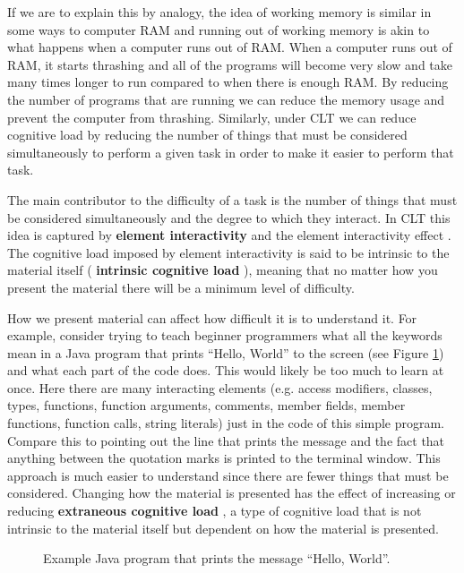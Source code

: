 \documentclass[12pt]{article}
\theoremstyle{grammarstyle}
\newcommand{\keyword}[1]{%
    \textbf{#1}%
}
\begin{document}
If we are to explain this by analogy, the idea of working memory is similar in some ways to computer RAM and running out of working memory is akin to what happens when a computer runs out of RAM. When a computer runs out of RAM, it starts thrashing and all of the programs will become very slow and take many times longer to run compared to when there is enough RAM. By reducing the number of programs that are running we can reduce the memory usage and prevent the computer from thrashing. Similarly, under CLT we can reduce cognitive load by reducing the number of things that must be considered simultaneously to perform a given task in order to make it easier to perform that task.

The main contributor to the difficulty of a task is the number of things that must be considered simultaneously and the degree to which they interact. In CLT this idea is captured by \keyword{element interactivity} and the element interactivity effect \citep{sweller2011element}. The cognitive load imposed by element interactivity is said to be intrinsic to the material itself (\keyword{intrinsic cognitive load}), meaning that no matter how you present the material there will be a minimum level of difficulty.

How we present material can affect how difficult it is to understand it. For example, consider trying to teach beginner programmers what all the keywords mean in a Java program that prints ``Hello, World'' to the screen (see Figure \ref{fig:java_hello_world}) and what each part of the code does. This would likely be too much to learn at once. Here there are many interacting elements (e.g. access modifiers, classes, types, functions, function arguments, comments, member fields, member functions, function calls, string literals) just in the code of this simple program. Compare this to pointing out the line that prints the message and the fact that anything between the quotation marks is printed to the terminal window. This approach is much easier to understand since there are fewer things that must be considered. Changing how the material is presented has the effect of increasing or reducing \keyword{extraneous cognitive load}, a type of cognitive load that is not intrinsic to the material itself but dependent on how the material is presented.

\begin{figure}
    \centering
     \lstset{xleftmargin=20pt}
    
    \caption{Example Java program that prints the message ``Hello, World''.}
    \label{fig:java_hello_world}
\end{figure}
\end{document}
